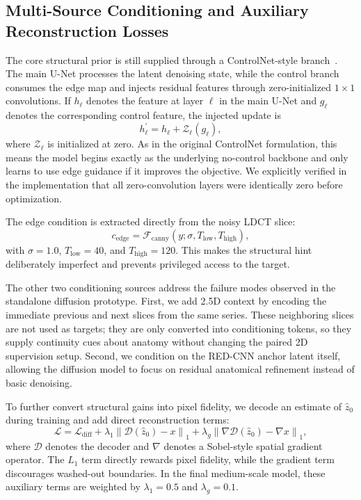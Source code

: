 \documentclass{article}
\begin{document}
\subsection{Multi-Source Conditioning and Auxiliary Reconstruction Losses}
The core structural prior is still supplied through a ControlNet-style branch~\cite{zhang2023controlnet}. The main U-Net processes the latent denoising state, while the control branch consumes the edge map and injects residual features through zero-initialized $1 \times 1$ convolutions. If $h_{\ell}$ denotes the feature at layer $\ell$ in the main U-Net and $g_{\ell}$ denotes the corresponding control feature, the injected update is
\begin{equation}
    h_{\ell}^{\prime} = h_{\ell} + \mathcal{Z}_{\ell}(g_{\ell}),
\end{equation}
where $\mathcal{Z}_{\ell}$ is initialized at zero. As in the original ControlNet formulation, this means the model begins exactly as the underlying no-control backbone and only learns to use edge guidance if it improves the objective. We explicitly verified in the implementation that all zero-convolution layers were identically zero before optimization.

The edge condition is extracted directly from the noisy LDCT slice:
\begin{equation}
    c_{\text{edge}} = \mathcal{F}_{\text{canny}}(y; \sigma, T_{\text{low}}, T_{\text{high}}),
\end{equation}
with $\sigma = 1.0$, $T_{\text{low}} = 40$, and $T_{\text{high}} = 120$. This makes the structural hint deliberately imperfect and prevents privileged access to the target.

The other two conditioning sources address the failure modes observed in the standalone diffusion prototype. First, we add 2.5D context by encoding the immediate previous and next slices from the same series. These neighboring slices are not used as targets; they are only converted into conditioning tokens, so they supply continuity cues about anatomy without changing the paired 2D supervision setup. Second, we condition on the RED-CNN anchor latent itself, allowing the diffusion model to focus on residual anatomical refinement instead of basic denoising.

To further convert structural gains into pixel fidelity, we decode an estimate of $\hat{z}_0$ during training and add direct reconstruction terms:
\begin{equation}
    \mathcal{L} = \mathcal{L}_{\text{diff}}
    + \lambda_{1}\left\| \mathcal{D}(\hat{z}_0) - x \right\|_1
    + \lambda_{g}\left\| \nabla \mathcal{D}(\hat{z}_0) - \nabla x \right\|_1,
\end{equation}
where $\mathcal{D}$ denotes the decoder and $\nabla$ denotes a Sobel-style spatial gradient operator. The $L_1$ term directly rewards pixel fidelity, while the gradient term discourages washed-out boundaries. In the final medium-scale model, these auxiliary terms are weighted by $\lambda_1 = 0.5$ and $\lambda_g = 0.1$.
\end{document}
